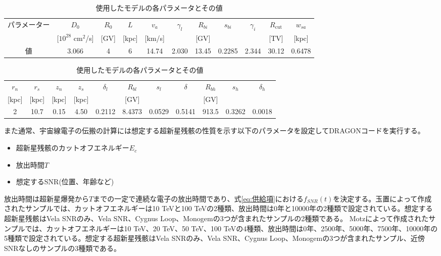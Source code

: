 \documentclass[a4paper,11truept]{ltjsreport}
\begin{document}
\begin{table}[H]
  \centering %
  \caption{使用したモデルの各パラメータとその値 \cite{naru2025}}
  \label{tab:model_parameters}
  
  \small
  \setlength{\tabcolsep}{5pt} %

  \begin{tabular}{|c|c|c|c|c|c|c|c|c|c|c|}
    \hline
    パラメーター & $D_0$ & $R_0$ & $L$ & $v_a$ & $\gamma_l$ & $R_{bi}$ & $s_{bi}$ & $\gamma_i$ & $R_{\text{cut}}$ & $w_{sa}$ \\
    & [$10^{28}$ cm$^2$/s] & [GV] & [kpc] & [km/s] & & [GV] & & & [TV] & [kpc] \\
    \hline
    値 & 3.066 & 4 & 6 & 14.74 & 2.030 & 13.45 & 0.2285 & 2.344 & 30.12 & 0.6478 \\
    \hline
  \end{tabular}

  \vspace{1em}

  \begin{tabular}{|c|c|c|c|c|c|c|c|c|c|c|}
    \hline
    $r_n$ & $r_s$ & $z_n$ & $z_s$ & $\delta_l$ & $R_{bl}$ & $s_{l}$ & $\delta$ & $R_{bh}$ & $s_h$ & $\delta_h$ \\
    {[kpc]} & [kpc] & [kpc] & [kpc] & & [GV] & & & [GV] & & \\
    \hline
    2 & 10.7 & 0.15 & 4.50 & 0.2112 & 8.4373 & 0.0529 & 0.5141 & 913.5 & 0.3262 & 0.0018 \\
    \hline
  \end{tabular}
\end{table}
また通常、宇宙線電子の伝搬の計算には想定する超新星残骸の性質を示す以下のパラメータを設定してDRAGONコードを実行する。
\begin{itemize}
\item 超新星残骸のカットオフエネルギー$E_c$
\item 放出時間$T$
\item 想定するSNR(位置、年齢など)
\end{itemize}
放出時間は超新星爆発から$T$までの一定で連続な電子の放出時間であり、式\ref{eq:供給項}における$f_{SNR}(t)$を決定する。玉置\cite{naru2025}によって作成されたサンプルでは、カットオフエネルギーは10 TeVと100 TeVの2種類、放出時間は0年と10000年の2種類で設定されている。想定する超新星残骸はVela SNRのみ、Vela SNR、Cygnus Loop、Monogemの3つが含まれたサンプルの2種類である。
Motz\cite{Motz:2025i3}によって作成されたサンプルでは、カットオフエネルギーは10 TeV、20 TeV、50 TeV、100 TeVの4種類、放出時間は0年、2500年、5000年、7500年、10000年の5種類で設定されている。想定する超新星残骸はVela SNRのみ、Vela SNR、Cygnus Loop、Monogemの3つが含まれたサンプル、近傍SNRなしのサンプルの3種類である。
\end{document}

